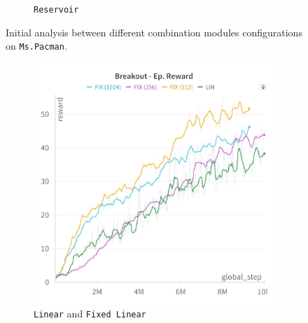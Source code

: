 \begin{figure}[ht]
\begin{subfigure}[b]{0.45\textwidth}
        \caption{\texttt{Reservoir}}
        \label{fig:mspacman_res}
    \end{subfigure}
    \caption{Initial analysis between different combination modules configurations on \texttt{Ms.Pacman}.}
    \label{fig:mspacman_concat_modules}
\end{figure}

\begin{figure}[ht]
    \centering
    \begin{subfigure}[b]{0.45\textwidth}
        \centering
        \includegraphics[width=\textwidth]{images/breakout_fix_lin.png}
        \caption{\texttt{Linear} and \texttt{Fixed Linear}}
        \label{fig:breakout_lin_fix}
    \end{subfigure}
    \hfill
    \begin{subfigure}[b]{0.45\textwidth}
        \centering

\end{subfigure}
\end{figure}

